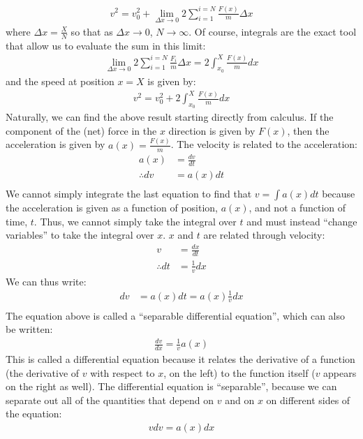 \begin{align*}
v^2 = v_0^2 + \lim_{\Delta x \to 0} 2\sum_{i=1}^{i=N} \frac{F(x)}{m}\Delta x
\end{align*}
where $\Delta x = \frac{X}{N}$ so that as $\Delta x\to 0$, $N\to\infty$. Of course, integrals are the exact tool that allow us to evaluate the sum in this limit:
\begin{align*}
\lim_{\Delta x \to 0} 2\sum_{i=1}^{i=N} \frac{F_i}{m}\Delta x =2 \int_{x_0}^{X}\frac{F(x)}{m}dx 
\end{align*}
and the speed at position $x=X$ is given by:
\begin{align*}
v^2 = v_0^2 + 2 \int_{x_0}^{X}\frac{F(x)}{m}dx 
\end{align*}
Naturally, we can find the above result starting directly from calculus. If the component of the (net) force in the $x$ direction is given by $F(x)$, then the  acceleration is given by $a(x) = \frac{F(x)}{m}$. The velocity is related to the acceleration:
\begin{align*}
a(x) &= \frac{dv}{dt}\\
\therefore dv &= a(x)dt\\
\end{align*}
We cannot simply integrate the last equation to find that $v=\int a(x)dt$ because the acceleration is given as a function of position, $a(x)$, and not a function of time, $t$. Thus, we cannot simply take the integral over $t$ and must instead ``change variables'' to take the integral over $x$. $x$ and $t$ are related through velocity:
\begin{align*}
v &= \frac{dx}{dt}\\
\therefore dt &= \frac{1}{v}dx
\end{align*}
We can thus write:
\begin{align*}
dv &= a(x)dt = a(x)\frac{1}{v}dx \\
\end{align*}
The equation above is called a ``separable differential equation'', which can also be written:
\begin{align*}
\frac{dv}{dx}=\frac{1}{v}a(x)
\end{align*}
This is called a differential equation because it relates the derivative of a function (the derivative of $v$ with respect to $x$, on the left) to the function itself ($v$ appears on the right as well). The differential equation is ``separable'', because we can separate out all of the quantities that depend on $v$ and on $x$ on different sides of the equation:
\begin{align*}
vdv = a(x)dx
\end{align*} 
